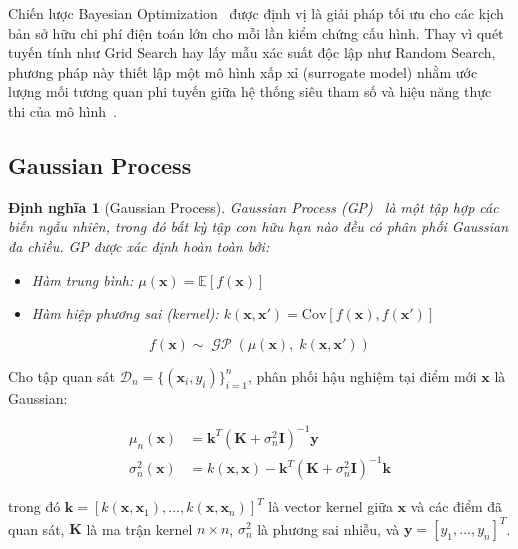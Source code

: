 \documentclass[12pt,a4paper]{article}
\newtheorem{definition}{Định nghĩa}[section]
\DeclareMathOperator{\GP}{\mathcal{GP}}
\begin{document}
Chiến lược Bayesian Optimization~\cite{snoek2012practical} được định vị là giải
pháp tối ưu cho các kịch bản sở hữu chi phí điện toán lớn cho mỗi lần kiểm
chứng cấu hình. Thay vì quét tuyến tính như Grid Search hay lấy mẫu xác suất
độc lập như Random Search, phương pháp này thiết lập một mô hình xấp xỉ
(surrogate model) nhằm ước lượng mối tương quan phi tuyến giữa hệ thống siêu
tham số và hiệu năng thực thi của mô hình~\cite{shahriari2016taking}.

\subsection{Gaussian Process}

\begin{definition}[Gaussian Process]
Gaussian Process (GP)~\cite{rasmussen2006gaussian} là một tập hợp các biến ngẫu
nhiên, trong đó bất kỳ tập con hữu hạn nào đều có phân phối Gaussian đa chiều.
GP được xác định hoàn toàn bởi:
\begin{itemize}
    \item Hàm trung bình: $\mu(\mathbf{x}) = \mathbb{E}[f(\mathbf{x})]$
    \item Hàm hiệp phương sai (kernel): $k(\mathbf{x}, \mathbf{x}') = \text{Cov}[f(\mathbf{x}), f(\mathbf{x}')]$
\end{itemize}

\begin{equation}
    f(\mathbf{x}) \sim \GP\!\left(\mu(\mathbf{x}),\; k(\mathbf{x}, \mathbf{x}')\right)
    \label{eq:gp_prior}
\end{equation}
\end{definition}

Cho tập quan sát $\mathcal{D}_n = \{(\mathbf{x}_i, y_i)\}_{i=1}^{n}$, phân
phối hậu nghiệm tại điểm mới $\mathbf{x}$ là Gaussian:

\begin{align}
    \mu_n(\mathbf{x}) &= \mathbf{k}^T (\mathbf{K} + \sigma_n^2 \mathbf{I})^{-1} \mathbf{y}
    \label{eq:gp_mean} \\
    \sigma_n^2(\mathbf{x}) &= k(\mathbf{x}, \mathbf{x}) - \mathbf{k}^T (\mathbf{K} + \sigma_n^2 \mathbf{I})^{-1} \mathbf{k}
    \label{eq:gp_var}
\end{align}

\noindent trong đó $\mathbf{k} = [k(\mathbf{x}, \mathbf{x}_1), \ldots, k(\mathbf{x}, \mathbf{x}_n)]^T$
là vector kernel giữa $\mathbf{x}$ và các điểm đã quan sát,
$\mathbf{K}$ là ma trận kernel $n \times n$,
$\sigma_n^2$ là phương sai nhiễu, và
$\mathbf{y} = [y_1, \ldots, y_n]^T$.
\end{document}
